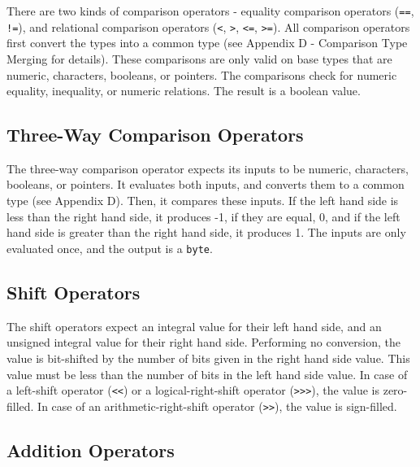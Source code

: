 \documentclass[letterpaper,12pt]{book}
\begin{document}
There are two kinds of comparison operators - equality comparison operators (\texttt{==}, \texttt{!=}), and relational comparison operators (\texttt{<}, \texttt{>}, \texttt{<=}, \texttt{>=}). All comparison operators first convert the types into a common type (see Appendix D - Comparison Type Merging for details). These comparisons are only valid on base types that are numeric, characters, booleans, or pointers. The comparisons check for numeric equality, inequality, or numeric relations. The result is a boolean value.

\subsection{Three-Way Comparison Operators}



The three-way comparison operator expects its inputs to be numeric, characters, booleans, or pointers. It evaluates both inputs, and converts them to a common type (see Appendix D). Then, it compares these inputs. If the left hand side is less than the right hand side, it produces -1, if they are equal, 0, and if the left hand side is greater than the right hand side, it produces 1. The inputs are only evaluated once, and the output is a \texttt{byte}.

\subsection{Shift Operators}



The shift operators expect an integral value for their left hand side, and an unsigned integral value for their right hand side. Performing no conversion, the value is bit-shifted by the number of bits given in the right hand side value. This value must be less than the number of bits in the left hand side value. In case of a left-shift operator (\texttt{<<}) or a logical-right-shift operator (\texttt{>>>}), the value is zero-filled. In case of an arithmetic-right-shift operator (\texttt{>>}), the value is sign-filled.

\subsection{Addition Operators}


\end{document}
